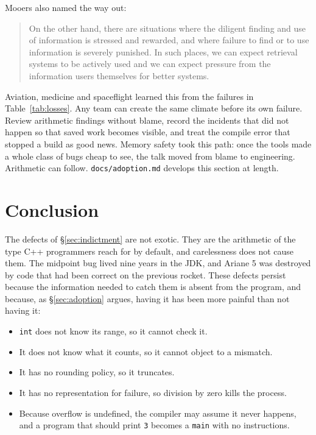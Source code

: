 \documentclass[11pt,a4paper]{article}
\newcommand{\code}[1]{\texttt{\small #1}}
\newcommand{\file}[1]{\texttt{\small #1}}
\begin{document}
Mooers also named the way out:

\begin{quote}\small
On the other hand, there are situations where the diligent finding and use of
information is stressed and rewarded, and where failure to find or to use
information is severely punished. In such places, we can expect retrieval
systems to be actively used and we can expect pressure from the information
users themselves for better systems.
\end{quote}

Aviation, medicine and spaceflight learned this from the failures in
Table~\ref{tab:losses}. Any team can create the same climate before its own
failure. Review arithmetic findings without blame, record the incidents that
did not happen so that saved work becomes visible, and treat the compile error
that stopped a build as good news. Memory safety took this path: once the
tools made a whole class of bugs cheap to see, the talk moved from blame to
engineering. Arithmetic can follow. \file{docs/adoption.md} develops this
section at length.

\section{Conclusion}

The defects of \S\ref{sec:indictment} are not exotic. They are the arithmetic
of the type C++ programmers reach for by default, and carelessness does not
cause them. The midpoint bug lived nine years in the JDK, and Ariane 5 was
destroyed by code that had been correct on the previous rocket. These defects
persist because the information needed to catch them is absent from the
program, and because, as \S\ref{sec:adoption} argues, having it has been more
painful than not having it:
\begin{itemize}
\item \code{int} does not know its range, so it cannot check it.
\item It does not know what it counts, so it cannot object to a mismatch.
\item It has no rounding policy, so it truncates.
\item It has no representation for failure, so division by zero kills the
      process.
\item Because overflow is undefined, the compiler may assume it never happens,
      and a program that should print \code{3} becomes a \code{main} with no
      instructions.
\end{itemize}
\end{document}
